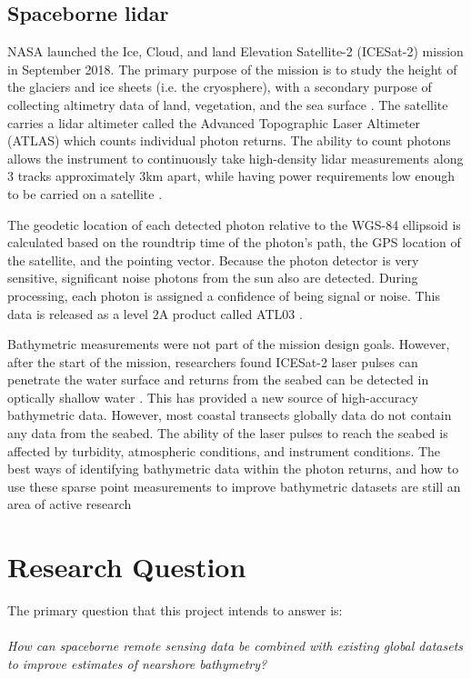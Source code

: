 \subsection{Spaceborne lidar}

NASA launched the Ice, Cloud, and land Elevation Satellite-2 (ICESat-2) mission in September 2018. The primary purpose of the mission is to study the height of the glaciers and ice sheets (i.e. the cryosphere), with a secondary purpose of collecting altimetry data of land, vegetation, and the sea surface \parencite{Markus2017}. The satellite carries a lidar altimeter called the Advanced Topographic Laser Altimeter (ATLAS) which counts individual photon returns. The ability to count photons allows the instrument to continuously take high-density lidar measurements along 3 tracks approximately 3km apart, while having power requirements low enough to be carried on a satellite \parencite{Popescu2018}. 

The geodetic location of each detected photon relative to the WGS-84 ellipsoid is calculated based on the roundtrip time of the photon's path, the GPS location of the satellite, and the pointing vector. Because the photon detector is very sensitive, significant noise photons from the sun also are detected. During processing, each photon is assigned a confidence of being signal or noise. This data is released as a level 2A product called ATL03 \parencite{Neumann2019d}.

Bathymetric measurements were not part of the mission design goals. However, after the start of the mission, researchers found ICESat-2 laser pulses can penetrate the water surface and returns from the seabed can be detected in optically shallow water \parencite{Parrish2019}. This has provided a  new source of high-accuracy bathymetric data. However, most coastal transects globally data do not contain any data from the seabed. The ability of the laser pulses to reach the seabed is affected by turbidity, atmospheric conditions, and instrument conditions. The best ways of identifying bathymetric data within the photon returns, and how to use these sparse point measurements to improve bathymetric datasets are still an area of active research

\section{Research Question}
The primary question that this project intends to answer is: \\
\\
\textit{How can spaceborne remote sensing data be combined with existing global datasets to improve estimates of nearshore bathymetry?} 

